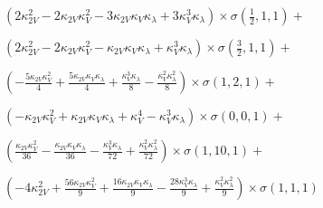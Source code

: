 $\left(2 \kappa_{2V}^{2} - 2 \kappa_{2V} \kappa_{V}^{2} - 3 \kappa_{2V} \kappa_{V} \kappa_{\lambda} + 3 \kappa_{V}^{3} \kappa_{\lambda}\right) \times \sigma{\left(\frac{1}{2},1,1 \right)} +$

$ \left(2 \kappa_{2V}^{2} - 2 \kappa_{2V} \kappa_{V}^{2} - \kappa_{2V} \kappa_{V} \kappa_{\lambda} + \kappa_{V}^{3} \kappa_{\lambda}\right) \times \sigma{\left(\frac{3}{2},1,1 \right)} +$

$ \left(- \frac{5 \kappa_{2V} \kappa_{V}^{2}}{4} + \frac{5 \kappa_{2V} \kappa_{V} \kappa_{\lambda}}{4} + \frac{\kappa_{V}^{3} \kappa_{\lambda}}{8} - \frac{\kappa_{V}^{2} \kappa_{\lambda}^{2}}{8}\right) \times \sigma{\left(1,2,1 \right)} +$

$ \left(- \kappa_{2V} \kappa_{V}^{2} + \kappa_{2V} \kappa_{V} \kappa_{\lambda} + \kappa_{V}^{4} - \kappa_{V}^{3} \kappa_{\lambda}\right) \times \sigma{\left(0,0,1 \right)} +$

$ \left(\frac{\kappa_{2V} \kappa_{V}^{2}}{36} - \frac{\kappa_{2V} \kappa_{V} \kappa_{\lambda}}{36} - \frac{\kappa_{V}^{3} \kappa_{\lambda}}{72} + \frac{\kappa_{V}^{2} \kappa_{\lambda}^{2}}{72}\right) \times \sigma{\left(1,10,1 \right)} +$

$ \left(- 4 \kappa_{2V}^{2} + \frac{56 \kappa_{2V} \kappa_{V}^{2}}{9} + \frac{16 \kappa_{2V} \kappa_{V} \kappa_{\lambda}}{9} - \frac{28 \kappa_{V}^{3} \kappa_{\lambda}}{9} + \frac{\kappa_{V}^{2} \kappa_{\lambda}^{2}}{9}\right) \times \sigma{\left(1,1,1 \right)}$
